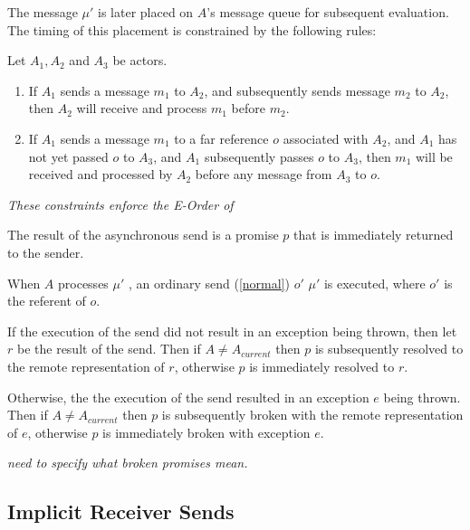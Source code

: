 \documentclass{article}
\begin{document}
The message $\mu'$ is later placed on $A$'s message queue for subsequent evaluation. The timing of this placement is  constrained by the following rules:

Let $A_1, A_2$ and $A_3$ be actors.
\begin{enumerate}
\item If  $A_1$ sends a message $m_1$ to  $A_2$, and subsequently sends message $m_2$ to $A_2$, then $A_2$ will receive and process $m_1$ before $m_2$.
\item  If $A_1$ sends a message $m_1$ to a far reference $o$ associated with $A_2$, and  $A_1$ has not yet passed $o$ to $A_3$, and $A_1$ subsequently passes $o$ to $A_3$, then $m_1$ will be received and processed by $A_2$ before any message from $A_3$ to $o$.
\end{enumerate}

{\it  These constraints enforce the E-Order of \cite{RobustComposition}}


The result of the asynchronous send is a promise $p$ that is immediately returned to the sender.

When $A$ processes $\mu'$ , an ordinary send (\ref{normal}) $o'$ $\mu'$ is executed, where $o'$ is the referent of $o$. 

If the execution of the send did not result in an exception being thrown, then let $r$ be the result of the send.   Then if $A \ne A_{current}$  then $p$ is subsequently resolved to the remote representation of $r$, otherwise $p$ is immediately resolved to $r$.

Otherwise, the the execution of the send resulted in an exception $e$ being thrown. Then if $A \ne A_{current}$  then $p$ is subsequently broken with the remote representation of $e$, otherwise $p$ is immediately broken with exception $e$.

{\it need to specify what broken promises mean. 
}

\subsection{Implicit Receiver Sends}
\label{here}
\end{document}
